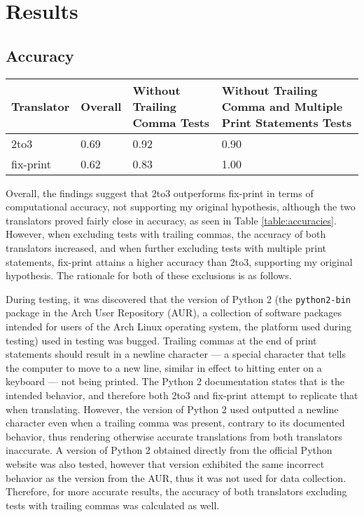 \section{Results}

\subsection{Accuracy}
\begin{table*}[ht!]
    \centering
    \begin{tabular}{@{}l|lll@{}}
    \toprule
    Translator & Overall & Without Trailing Comma Tests & Without Trailing Comma and Multiple Print Statements Tests \\ \midrule
    2to3       & 0.69                         & 0.92                                      & 0.90                                                                             \\
    fix-print & 0.62                          & 0.83                                      & 1.00                                                                               \\ \bottomrule
    \end{tabular}
    \caption{Computational accuracy of 2to3 and fix-print.}
    \label{table:accuracies}
\end{table*}

Overall, the findings suggest that 2to3 outperforms fix-print in terms of computational accuracy, not supporting my original hypothesis, although the two translators proved fairly close in accuracy, as seen in Table \ref{table:accuracies}. However, when excluding tests with trailing commas, the accuracy of both translators increased, and when further excluding tests with multiple print statements, fix-print attains a higher accuracy than 2to3, supporting my original hypothesis. The rationale for both of these exclusions is as follows.

During testing, it was discovered that the version of Python 2 (the \verb|python2-bin| package in the Arch User Repository (AUR), a collection of software packages intended for users of the Arch Linux operating system, the platform used during testing) used in testing was bugged. Trailing commas at the end of print statements should result in a newline character --- a special character that tells the computer to move to a new line, similar in effect to hitting enter on a keyboard --- not being printed. The Python 2 documentation states that is the intended behavior, and therefore both 2to3 and fix-print attempt to replicate that when translating. However, the version of Python 2 used outputted a newline character even when a trailing comma was present, contrary to its documented behavior, thus rendering otherwise accurate translations from both translators inaccurate. A version of Python 2 obtained directly from the official Python website was also tested, however that version exhibited the same incorrect behavior as the version from the AUR, thus it was not used for data collection. Therefore, for more accurate results, the accuracy of both translators excluding tests with trailing commas was calculated as well.

